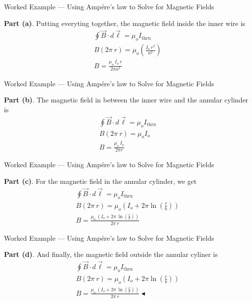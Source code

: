 \documentclass{beamer}
\begin{document}
\begin{frame}{Worked Example --- Using Amp{\'e}re's law to Solve for Magnetic Fields}

\textbf{Part (a)}. Putting everyting together, the magnetic field inside the inner wire is
\begin{gather*}
    \oint \vec{B} \cdot d\vec{\ell} = \mu_o I_{\text{thru}} \\
    B \left( 2\pi\ r \right) = \mu_o \left( \frac{I_o\ r^2}{a^2} \right) \\
    \boxed{B = \frac{\mu_o\ I_o\ r}{2\pi a^2}}
\end{gather*}

\end{frame}

\begin{frame}{Worked Example --- Using Amp{\'e}re's law to Solve for Magnetic Fields}

\textbf{Part (b)}. The magnetic field in between the inner wire and the annular cylinder is
\begin{gather*}
    \oint \vec{B} \cdot d\vec{\ell} = \mu_o I_{\text{thru}} \\
    B \left( 2\pi\ r \right) = \mu_o I_o \\
    \boxed{B = \frac{\mu_o\ I_o}{2\pi r}}
\end{gather*}

\end{frame}

\begin{frame}{Worked Example --- Using Amp{\'e}re's law to Solve for Magnetic Fields}

\textbf{Part (c)}. For the magnetic field in the annular cylinder, we get
\begin{gather*}
    \oint \vec{B} \cdot d\vec{\ell} = \mu_o I_{\text{thru}} \\
    B \left( 2\pi\ r \right) = \mu_o \left( I_o + 2\pi \ln{\left( \frac{r}{b} \right)} \right) \\
    \boxed{B = \frac{\mu_o\ \left( I_o + 2\pi\ \ln{\left( \frac{r}{b} \right)} \right)}{2\pi\ r}}
\end{gather*}

\end{frame}

\begin{frame}{Worked Example --- Using Amp{\'e}re's law to Solve for Magnetic Fields}

\textbf{Part (d)}. And finally, the magnetic field outside the annular cyliner is
\begin{gather*}
    \oint \vec{B} \cdot d\vec{\ell} = \mu_o I_{\text{thru}} \\
    B \left( 2\pi\ r \right) = \mu_o \left( I_o + 2\pi \ln{\left( \frac{c}{b} \right)} \right) \\
    \boxed{B = \frac{\mu_o\ \left( I_o + 2\pi\ \ln{\left( \frac{c}{b} \right)} \right)}{2\pi\ r}} \blacktriangleleft
\end{gather*}

\end{frame}
\end{document}
